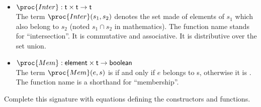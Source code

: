 \begin{itemize}
\begin{itemize}
       \item \(\proc{Inter} : \type{t} \times \type{t} \rightarrow
         \type{t}\)\\
       The term \(\proc{Inter} (s_1, s_2)\) denotes the set
       made of elements of \(s_1\) which also belong to \(s_2\)
       (noted \(s_1 \cap s_2\) in mathematics). The function
       name stands for ``intersection''. It is commutative and
       associative. It is distributive over the set union.

       \item \(\proc{Mem} : \type{element} \times \type{t} \rightarrow
         \type{boolean}\)\\
       The term \(\proc{Mem} (e, s)\) is  if and
       only if \(e\) belongs to s, otherwise it is
       . The function name is a shorthand for ``membership''.

     \end{itemize}

   \end{itemize}
   Complete this signature with equations defining the constructors
   and functions.

